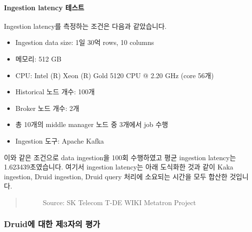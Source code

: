 \documentclass[letterpaper,10pt,english]{sphinxmanual}
\begin{document}
\paragraph{Ingestion latency 테스트}
\label{\detokenize{discovery/part01/druid_tests:id4}}
Ingestion latency를 측정하는 조건은 다음과 같았습니다.
\begin{itemize}
\item {} 
Ingestion data size: 1일 30억 rows, 10 columns

\item {} 
메모리: 512 GB

\item {} 
CPU: Intel (R) Xeon (R) Gold 5120 CPU @ 2.20 GHz (core 56개)

\item {} 
Historical 노드 개수: 100개

\item {} 
Broker 노드 개수: 2개

\item {} 
총 10개의 middle manager 노드 중 3개에서 job 수행

\item {} 
Ingestion 도구: Apache Kafka

\end{itemize}

이와 같은 조건으로 data ingestion을 100회 수행하였고 평균 ingestion latency는 1.623439초였습니다. 여기서 ingestion latency는 아래 도식화한 것과 같이 Kaka ingestion, Druid ingestion, Druid query 처리에 소요되는 시간을 모두 합산한 것입니다.
\begin{quote}

\begin{figure}[H]
\centering
\capstart

\noindent{}
\caption{Source: SK Telecom T-DE WIKI Metatron Project}\label{\detokenize{discovery/part01/druid_tests:id16}}\end{figure}
\end{quote}


\subsubsection{Druid에 대한 제3자의 평가}
\label{\detokenize{discovery/part01/druid_tests:druid-3}}
\end{document}
